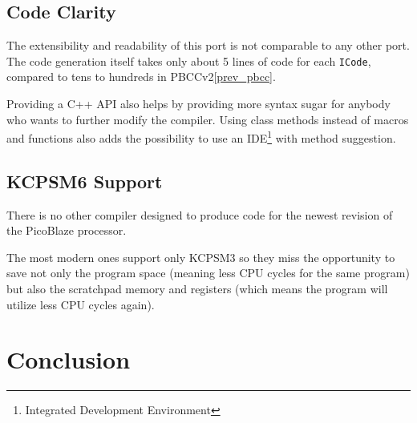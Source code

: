     \section{Code Clarity}

    The extensibility and readability of this port is not comparable to any other port. The code generation itself takes only about 5 lines of code for each \texttt{ICode}, compared to tens to hundreds in PBCCv2\ref{prev_pbcc}.

    Providing a C++ API also helps by providing more syntax sugar for anybody who wants to further modify the compiler. Using class methods instead of macros and functions also adds the possibility to use an IDE\footnote{Integrated Development Environment} with method suggestion.

    \section{KCPSM6 Support}

    There is no other compiler designed to produce code for the newest revision of the PicoBlaze processor.

    The most modern ones support only KCPSM3 so they miss the opportunity to save not only the program space (meaning less CPU cycles for the same program) but also the scratchpad memory and registers (which means the program will utilize less CPU cycles again).

\chapter{Conclusion}\label{conclusion}


\cite{TBD}
